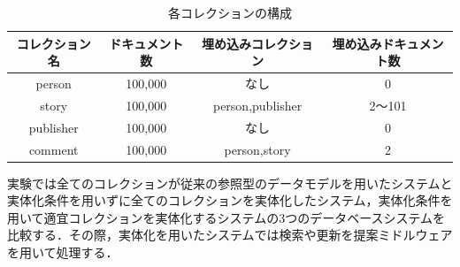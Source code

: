 \documentclass[a4paper,11pt]{ujreport}
\begin{document}
\begin{table}[htb]
  \begin{center}
    \caption{各コレクションの構成}
		\label{table:experimentCollectionNumberOfDocument}
    \begin{tabular}{|c|c|c|c|} \hline
      コレクション名  & ドキュメント数 & 埋め込みコレクション & 埋め込みドキュメント数\\ \hline
      person & 100,000 & なし & 0 \\ \hline
      story & 100,000 & person,publisher & 2〜101 \\ \hline
      publisher & 100,000 & なし & 0\\ \hline
			comment & 100,000 & person,story & 2\\ \hline
    \end{tabular}
  \end{center}
\end{table}

実験では全てのコレクションが従来の参照型のデータモデルを用いたシステムと実体化条件を用いずに全てのコレクションを実体化したシステム，実体化条件を用いて適宜コレクションを実体化するシステムの3つのデータベースシステムを比較する．その際，実体化を用いたシステムでは検索や更新を提案ミドルウェアを用いて処理する．
\end{document}
